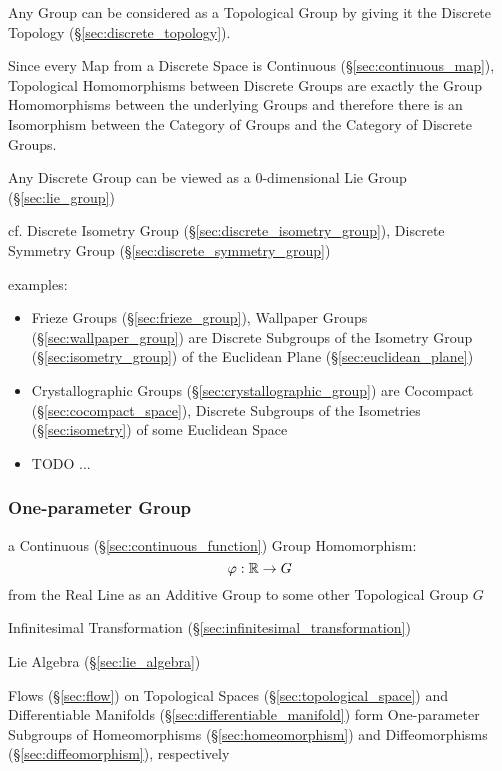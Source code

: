 Any Group can be considered as a Topological Group by giving it the Discrete
Topology (\S\ref{sec:discrete_topology}).

Since every Map from a Discrete Space is Continuous
(\S\ref{sec:continuous_map}), Topological Homomorphisms between Discrete Groups
are exactly the Group Homomorphisms between the underlying Groups and therefore
there is an Isomorphism between the Category of Groups and the Category of
Discrete Groups.

Any Discrete Group can be viewed as a $0$-dimensional Lie Group
(\S\ref{sec:lie_group}) %

cf. Discrete Isometry Group (\S\ref{sec:discrete_isometry_group}), Discrete
Symmetry Group (\S\ref{sec:discrete_symmetry_group})

examples:
\begin{itemize}
  \item Frieze Groups (\S\ref{sec:frieze_group}), Wallpaper Groups
    (\S\ref{sec:wallpaper_group}) are Discrete Subgroups of the Isometry Group
    (\S\ref{sec:isometry_group}) of the Euclidean Plane
    (\S\ref{sec:euclidean_plane})
  \item Crystallographic Groups (\S\ref{sec:crystallographic_group}) are
    Cocompact (\S\ref{sec:cocompact_space}), Discrete Subgroups of the
    Isometries (\S\ref{sec:isometry}) of some Euclidean Space
  \item TODO
  ...
\end{itemize}



\subsubsection{One-parameter Group}\label{sec:one_parameter_group}

a Continuous (\S\ref{sec:continuous_function}) Group Homomorphism:
\[
  \varphi : \mathbb{R} \rightarrow G
\]
from the Real Line as an Additive Group to some other Topological Group $G$

Infinitesimal Transformation (\S\ref{sec:infinitesimal_transformation})

Lie Algebra (\S\ref{sec:lie_algebra})

Flows (\S\ref{sec:flow}) on Topological Spaces (\S\ref{sec:topological_space})
and Differentiable Manifolds (\S\ref{sec:differentiable_manifold}) form
One-parameter Subgroups of Homeomorphisms (\S\ref{sec:homeomorphism}) and
Diffeomorphisms (\S\ref{sec:diffeomorphism}), respectively



